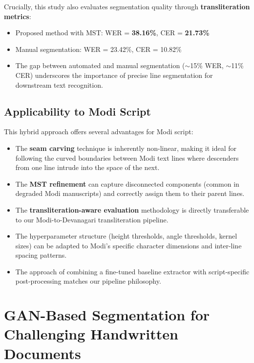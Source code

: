 \documentclass[11pt, a4paper]{article}
\begin{document}
Crucially, this study also evaluates segmentation quality through \textbf{transliteration metrics}:
\begin{itemize}[leftmargin=1.5em]
    \item Proposed method with MST: WER = \textbf{38.16\%}, CER = \textbf{21.73\%}
    \item Manual segmentation: WER = 23.42\%, CER = 10.82\%
    \item The gap between automated and manual segmentation ($\sim$15\% WER, $\sim$11\% CER) underscores the importance of precise line segmentation for downstream text recognition.
\end{itemize}

\subsection{Applicability to Modi Script}

This hybrid approach offers several advantages for Modi script:
\begin{itemize}[leftmargin=1.5em]
    \item The \textbf{seam carving} technique is inherently non-linear, making it ideal for following the curved boundaries between Modi text lines where descenders from one line intrude into the space of the next.
    \item The \textbf{MST refinement} can capture disconnected components (common in degraded Modi manuscripts) and correctly assign them to their parent lines.
    \item The \textbf{transliteration-aware evaluation} methodology is directly transferable to our Modi-to-Devanagari transliteration pipeline.
    \item The hyperparameter structure (height thresholds, angle thresholds, kernel sizes) can be adapted to Modi's specific character dimensions and inter-line spacing patterns.
    \item The approach of combining a fine-tuned baseline extractor with script-specific post-processing matches our pipeline philosophy.
\end{itemize}


\section{GAN-Based Segmentation for Challenging Handwritten Documents}
\label{sec:gan_challenging}
\end{document}
